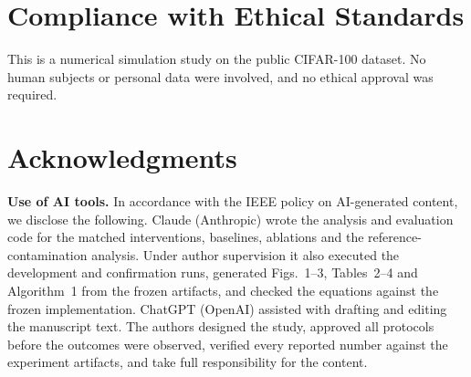 \section{Compliance with Ethical Standards}
\label{sec:ethics}
This is a numerical simulation study on the public CIFAR-100 dataset. No human subjects or personal data were
involved, and no ethical approval was required.

\section{Acknowledgments}
\label{sec:acknowledgments}
\textbf{Use of AI tools.} In accordance with the IEEE policy on AI-generated content, we disclose the following.
Claude (Anthropic) wrote the analysis and evaluation code for the matched interventions, baselines, ablations and
the reference-contamination analysis. Under author supervision it also executed the development and confirmation
runs, generated Figs.~1--3, Tables~2--4 and Algorithm~1 from the frozen artifacts, and checked the equations
against the frozen implementation. ChatGPT (OpenAI) assisted with drafting and editing the manuscript text. The
authors designed the study, approved all protocols before the outcomes were observed, verified every reported
number against the experiment artifacts, and take full responsibility for the content.
